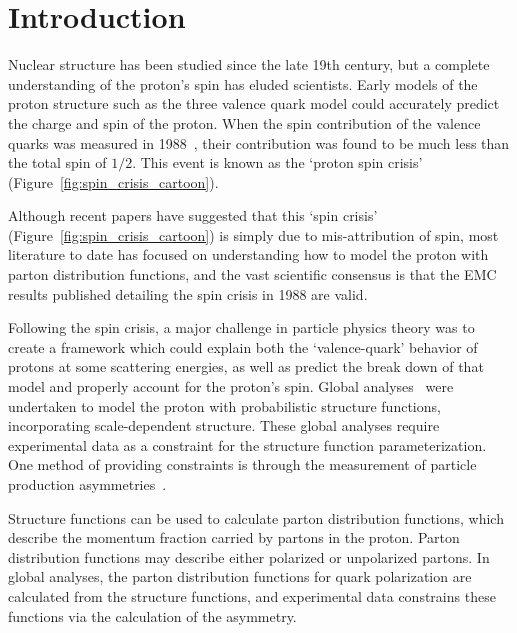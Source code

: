 \chapter{Introduction}

Nuclear structure has been studied since the late 19th century, but a complete
understanding of the proton's spin has eluded scientists.  Early models of the
proton structure such as the three valence quark model could accurately predict
the charge and spin of the proton. When the spin contribution of the valence
quarks was measured in 1988~\cite{Ashman1988}, their contribution was found to
be much less than the total spin of $1/2$. This event is known as the `proton
spin crisis' (Figure~\ref{fig:spin_crisis_cartoon}).

Although recent papers \cite{Povh2016} have suggested that this `spin crisis'
(Figure~\ref{fig:spin_crisis_cartoon}) is simply due to mis-attribution of
spin, most literature to date has focused on understanding how to model the
proton with parton distribution functions, and the vast scientific consensus is
that the EMC results published detailing the spin crisis in 1988 are valid.

Following the spin crisis, a major challenge in particle physics theory was to
create a framework which could explain both the `valence-quark' behavior of
protons at some scattering energies, as well as predict the break down of that
model and properly account for the proton's spin. Global
analyses~\cite{DeFlorian2009} were undertaken to model the proton with
probabilistic structure functions, incorporating scale-dependent structure.
These global analyses require experimental data as a constraint for the
structure function parameterization. One method of providing constraints is
through the measurement of particle production asymmetries~\cite{Kang2011}.
\clearpage

Structure functions can be used to calculate parton distribution functions,
which describe the momentum fraction carried by partons in the proton. Parton
distribution functions may describe either polarized or unpolarized partons. In
global analyses, the parton distribution functions for quark polarization are
calculated from the structure functions, and experimental data constrains these
functions via the calculation of the asymmetry.

